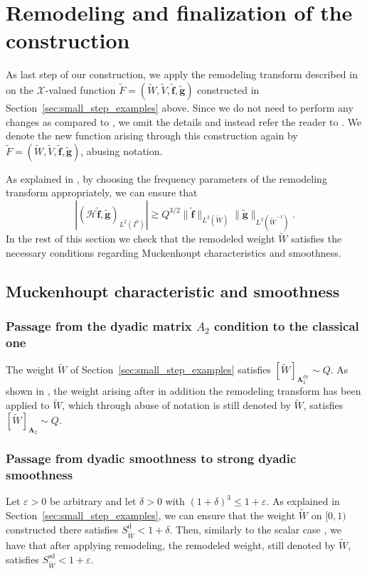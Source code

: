 \documentclass{amsart}
\newcommand{\e}{\varepsilon}
\newcommand{\wt}{\widetilde}
\theoremstyle{definition}
\theoremstyle{remark}
\begin{document}
\section{Remodeling and finalization of the construction}

As last step of our construction, we apply the remodeling transform described in \cite[Section 7]{DoPeTrVo} on the $\mathscr{X}$-valued function $\wt{F} = (\wt{W},\wt{V},\wt{\mathbf{f}},\wt{\mathbf{g}})$ constructed in Section~\ref{sec:small_step_examples} above. Since we do not need to perform any changes as compared to \cite[Section 7]{DoPeTrVo}, we omit the details and instead refer the reader to \cite[Section 7]{DoPeTrVo}. We denote the new function arising through this construction again by $\wt{F} = (\wt{W},\wt{V},\wt{\mathbf{f}},\wt{\mathbf{g}})$, abusing notation.

As explained in \cite[Section 8]{DoPeTrVo}, by choosing the frequency parameters of the remodeling transform appropriately, we can ensure that
\begin{equation*}
    |(\mathcal{H}\wt{\mathbf{f}},\wt{\mathbf{g}})_{L^2(I^0)}|\gtrsim Q^{3/2}\|\wt{\mathbf{f}}\|_{L^2(\wt{W})}\|\wt{\mathbf{g}}\|_{L^2(\wt{W}^{-1})}.
\end{equation*}
In the rest of this section we check that the remodeled weight $\wt{W}$ satisfies the necessary conditions regarding Muckenhoupt characteristics and smoothness.

\subsection{Muckenhoupt characteristic and smoothness}
    
\subsubsection{Passage from the dyadic matrix \texorpdfstring{$A_2$}{A2} condition to the classical one} The weight $\wt{W}$ of Section~\ref{sec:small_step_examples} satisfies $[\wt{W}]_{\mathbf{A}_2^{\mathrm{dy}}}\sim Q$. As shown in \cite[Subsection 9.1]{DoPeTrVo}, the weight arising after in addition the remodeling transform has been applied to $\wt{W}$, which through abuse of notation is still denoted by $\wt{W}$, satisfies $[\wt{W}]_{\mathbf{A}_2}\sim Q$.
	
\subsubsection{Passage from dyadic smoothness to strong dyadic smoothness} Let $\e>0$ be arbitrary and let $\delta>0$ with $(1+\delta)^3\leq1+\e$. As explained in Section~\ref{sec:small_step_examples}, we can ensure that the weight $\wt{W}$ on $[0,1)$ constructed there satisfies $S_{\wt{W}}^{\text{d}}<1+\delta$. Then, similarly to the scalar case \cite[Lemma 6.1]{KaTr}, we have that after applying remodeling, the remodeled weight, still denoted by $\wt{W}$, satisfies $S_{\wt{W}}^{\text{sd}}<1+\e$.



\end{document}

